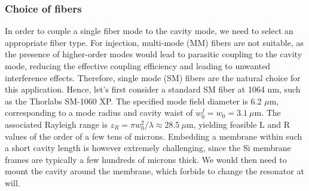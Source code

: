 \subsubsection{Choice of fibers}
In order to couple a single fiber mode to the cavity mode, we need to select an appropriate fiber type. For injection, multi-mode (MM) fibers are not suitable, as the presence of higher-order modes would lead to parasitic coupling to the cavity mode, reducing the effective coupling efficiency and leading to unwanted interference effects. Therefore, single mode (SM) fibers are the natural choice for this application. Hence, let's first consider a standard SM fiber at 1064 nm, such as the Thorlabs SM-1060 XP. The specified mode field diameter is 6.2 $\mu$m, corresponding to a mode radius and cavity waist of $w_0^f = w_0 = 3.1~\mu\mathrm{m}$. The associated Rayleigh range is $z_R = \pi w_0^2/\lambda \approx 28.5~\mu\mathrm{m}$, yielding feasible L and R values of the order of a few tens of microns. Embedding a membrane within such a short cavity length is however extremely challenging, since the Si membrane frames are typically a few hundreds of microns thick. We would then need to mount the cavity around the membrane, which forbids to change the resonator at will. \\ 

